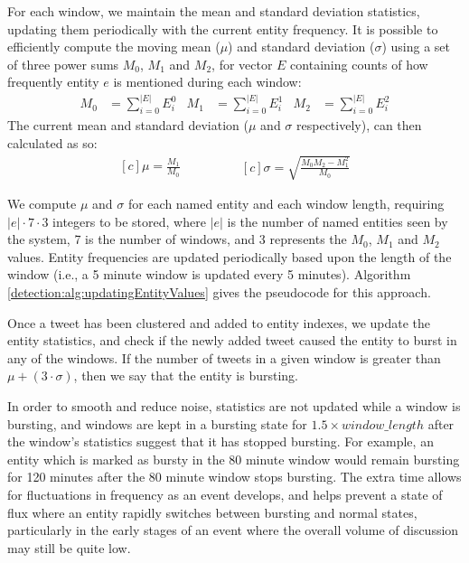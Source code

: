 For each window, we maintain the mean and standard deviation statistics, updating them periodically with the current entity frequency.
It is possible to efficiently compute the moving mean (\(\mu\)) and standard deviation (\(\sigma\)) using a set of three power sums \(M_0\), \(M_1\) and \(M_2\), for vector $E$ containing counts of how frequently entity $e$ is mentioned during each window:
\begin{align*}
	M_0 &= \sum_{i = 0}^{|E|}{E_i^0} & M_1 &= \sum_{i = 0}^{|E|}{E_i^1} & M_2 &= \sum_{i = 0}^{|E|}{E_{i}^2}
\end{align*}
The current mean and standard deviation (\(\mu\) and \(\sigma\) respectively), can then calculated as so:
\begin{equation*}
	\begin{aligned}[c]
		\mu = \frac{M_1}{M_0}
	\end{aligned}
	\qquad\qquad
	\begin{aligned}[c]
		\sigma = \sqrt{\frac{M_0 M_2 - M_1^2}{M_0}}
	\end{aligned}
\end{equation*}

We compute \(\mu\) and \(\sigma\) for each named entity and each window length, requiring $|e| \cdot 7 \cdot 3$ integers to be stored, where $|e|$ is the number of named entities seen by the system, 7 is the number of windows, and 3 represents the $M_0$, $M_1$ and $M_2$ values.
Entity frequencies are updated periodically based upon the length of the window (i.e., a 5 minute window is updated every 5 minutes).
Algorithm \ref{detection:alg:updatingEntityValues} gives the pseudocode for this approach.

Once a tweet has been clustered and added to entity indexes, we update the entity statistics, and check if the newly added tweet caused the entity to burst in any of the windows.
If the number of tweets in a given window is greater than \(\mu + (3 \cdot \sigma)\), then we say that the entity is bursting.

In order to smooth and reduce noise, statistics are not updated while a window is bursting, and windows are kept in a bursting state for \(1.5 \times window\_length\) after the window's statistics suggest that it has stopped bursting.
For example, an entity which is marked as bursty in the 80 minute window would remain bursting for 120 minutes after the 80 minute window stops bursting.
The extra time allows for fluctuations in frequency as an event develops, and helps prevent a state of flux where an entity rapidly switches between bursting and normal states, particularly in the early stages of an event where the overall volume of discussion may still be quite low.


